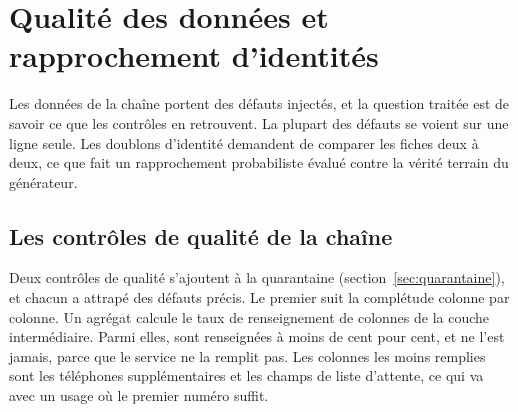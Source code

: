 \chapter{Qualité des données et rapprochement d'identités}\label{chap:qualite}

Les données de la chaîne portent des défauts injectés, et la question traitée est de savoir ce que
les contrôles en retrouvent. La plupart des défauts se voient sur une ligne seule. Les doublons
d'identité demandent de comparer les fiches deux à deux, ce que fait un rapprochement probabiliste
évalué contre la vérité terrain du générateur.

\section{Les contrôles de qualité de la chaîne}

Deux contrôles de qualité s'ajoutent à la quarantaine (section~\ref{sec:quarantaine}), et chacun a
attrapé des défauts précis. Le premier suit la complétude colonne par colonne. Un agrégat calcule
le taux de renseignement de  colonnes de la couche intermédiaire.
Parmi elles,  sont renseignées à moins de cent pour cent, et
 ne l'est jamais, parce que le service ne la remplit pas. Les colonnes
les moins remplies sont les téléphones supplémentaires et les champs de liste d'attente, ce qui va
avec un usage où le premier numéro suffit.

